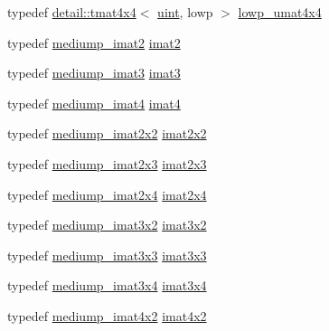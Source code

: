 \begin{DoxyCompactItemize}
\item 
typedef \hyperlink{structglm_1_1detail_1_1tmat4x4}{detail\+::tmat4x4}$<$ \hyperlink{group__core__precision_ga4fd29415871152bfb5abd588334147c8}{uint}, lowp $>$ \hyperlink{group__gtc__matrix__integer_ga394ee910348beffe9c7d6b694d5efe5f}{lowp\+\_\+umat4x4}
\item 
typedef \hyperlink{group__gtc__matrix__integer_gaec03a8eef2ec2536f8bebffd0bac8192}{mediump\+\_\+imat2} \hyperlink{group__gtc__matrix__integer_ga77a581b3366fb63fc72f8f20830003e0}{imat2}
\item 
typedef \hyperlink{group__gtc__matrix__integer_ga6b438ab863af0122b532adc93b89105e}{mediump\+\_\+imat3} \hyperlink{group__gtc__matrix__integer_ga45481922dd07a3a8e23758286311ee97}{imat3}
\item 
typedef \hyperlink{group__gtc__matrix__integer_gabf1a0fd4c85a21f67535b737e1feb355}{mediump\+\_\+imat4} \hyperlink{group__gtc__matrix__integer_ga40fc5c5e0b07543497aa1c314891544a}{imat4}
\item 
typedef \hyperlink{group__gtc__matrix__integer_ga472222f6e3754124ee9cb64acaaedac1}{mediump\+\_\+imat2x2} \hyperlink{group__gtc__matrix__integer_gaf7f44f44d966377666d41ed059524732}{imat2x2}
\item 
typedef \hyperlink{group__gtc__matrix__integer_gabc92c714c2d257213c5b0771669df177}{mediump\+\_\+imat2x3} \hyperlink{group__gtc__matrix__integer_ga143bc5177bac9991d84b70da03952516}{imat2x3}
\item 
typedef \hyperlink{group__gtc__matrix__integer_ga90b020de8489a1d4424c0ffcc17c83dd}{mediump\+\_\+imat2x4} \hyperlink{group__gtc__matrix__integer_gafe2d058e164fd1badace451ffcf4ae46}{imat2x4}
\item 
typedef \hyperlink{group__gtc__matrix__integer_ga2a90775c74656b8a825f24d510f0ea5d}{mediump\+\_\+imat3x2} \hyperlink{group__gtc__matrix__integer_ga04deef94cdfdd3b3b2706e10a32ef7f3}{imat3x2}
\item 
typedef \hyperlink{group__gtc__matrix__integer_gac5ee8dc182055bb0a00a90c031d4a714}{mediump\+\_\+imat3x3} \hyperlink{group__gtc__matrix__integer_gaeff9ef8f56cccc828d6b897923e75402}{imat3x3}
\item 
typedef \hyperlink{group__gtc__matrix__integer_gaaac79be4db34dde570c3331ffe728d55}{mediump\+\_\+imat3x4} \hyperlink{group__gtc__matrix__integer_gaee5507e6cbbdd05841a0c174e60dd036}{imat3x4}
\item 
typedef \hyperlink{group__gtc__matrix__integer_gacdae7d6ae4820756c62c2b5fd5c0370a}{mediump\+\_\+imat4x2} \hyperlink{group__gtc__matrix__integer_ga7e733984837e0e7aa9f4aac18f632f63}{imat4x2}

\end{DoxyCompactItemize}
